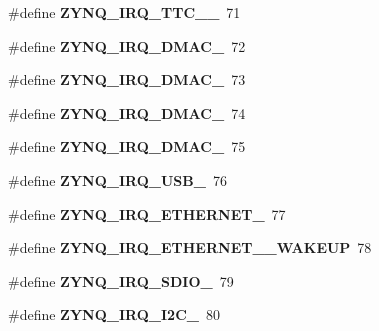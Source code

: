 \begin{DoxyCompactItemize}
\#define {\bfseries Z\+Y\+N\+Q\+\_\+\+I\+R\+Q\+\_\+\+T\+T\+C\+\_\+\_}~71
\item 
\mbox{\label{group__zynq__interrupt_ga2ab2b52a1a8347532834e63703256aa1}} 
\#define {\bfseries Z\+Y\+N\+Q\+\_\+\+I\+R\+Q\+\_\+\+D\+M\+A\+C\+\_}~72
\item 
\mbox{\label{group__zynq__interrupt_ga06bf698f25bc2599863e2f1121856922}} 
\#define {\bfseries Z\+Y\+N\+Q\+\_\+\+I\+R\+Q\+\_\+\+D\+M\+A\+C\+\_}~73
\item 
\mbox{\label{group__zynq__interrupt_gad57ddc774962e3ab035dd8a5cd475d73}} 
\#define {\bfseries Z\+Y\+N\+Q\+\_\+\+I\+R\+Q\+\_\+\+D\+M\+A\+C\+\_}~74
\item 
\mbox{\label{group__zynq__interrupt_gac30f5a915617103e5a8c59c76f38d850}} 
\#define {\bfseries Z\+Y\+N\+Q\+\_\+\+I\+R\+Q\+\_\+\+D\+M\+A\+C\+\_}~75
\item 
\mbox{\label{group__zynq__interrupt_ga5f8db7c527661ea9b873130d5e423c8c}} 
\#define {\bfseries Z\+Y\+N\+Q\+\_\+\+I\+R\+Q\+\_\+\+U\+S\+B\+\_}~76
\item 
\mbox{\label{group__zynq__interrupt_ga516b61e791efc84f625695a8879be726}} 
\#define {\bfseries Z\+Y\+N\+Q\+\_\+\+I\+R\+Q\+\_\+\+E\+T\+H\+E\+R\+N\+E\+T\+\_}~77
\item 
\mbox{\label{group__zynq__interrupt_ga0ab370cc7f0f54aa9acb5ec2c778ac43}} 
\#define {\bfseries Z\+Y\+N\+Q\+\_\+\+I\+R\+Q\+\_\+\+E\+T\+H\+E\+R\+N\+E\+T\+\_\+\_\+\+W\+A\+K\+E\+UP}~78
\item 
\mbox{\label{group__zynq__interrupt_ga903ee842fb7eee35902defcf8ee5e363}} 
\#define {\bfseries Z\+Y\+N\+Q\+\_\+\+I\+R\+Q\+\_\+\+S\+D\+I\+O\+\_}~79
\item 
\mbox{\label{group__zynq__interrupt_ga453df161b08827aaaaf7fd82a4a07096}} 
\#define {\bfseries Z\+Y\+N\+Q\+\_\+\+I\+R\+Q\+\_\+\+I2\+C\+\_}~80
\item 
\mbox{\label{group__zynq__interrupt_ga0672a3f8e46b08e3122f2ecbd9419ad5}} 

\end{DoxyCompactItemize}
